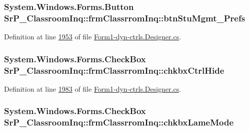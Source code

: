 \hypertarget{class_sr_p___classroom_inq_1_1frm_classrrom_inq_af14017019a644ec6c1d32d49fb0e59f1}{
\subsubsection[{btn\-Stu\-Mgmt\-\_\-\-Prefs}]{\setlength{\rightskip}{0pt plus 5cm}\-System.\-Windows.\-Forms.\-Button {\bf \-Sr\-P\-\_\-\-Classroom\-Inq\-::frm\-Classrrom\-Inq\-::btn\-Stu\-Mgmt\-\_\-\-Prefs}}}
\label{class_sr_p___classroom_inq_1_1frm_classrrom_inq_af14017019a644ec6c1d32d49fb0e59f1}


\-Definition at line \hyperlink{_form1-dyn-ctrls_8_designer_8cs_source_l01953}{1953} of file \hyperlink{_form1-dyn-ctrls_8_designer_8cs_source}{\-Form1-\/dyn-\/ctrls.\-Designer.\-cs}.

\hypertarget{class_sr_p___classroom_inq_1_1frm_classrrom_inq_a65b5726e5b2299abee70eba1a67b6ea3}{
\subsubsection[{chkbx\-Ctrl\-Hide}]{\setlength{\rightskip}{0pt plus 5cm}\-System.\-Windows.\-Forms.\-Check\-Box {\bf \-Sr\-P\-\_\-\-Classroom\-Inq\-::frm\-Classrrom\-Inq\-::chkbx\-Ctrl\-Hide}}}
\label{class_sr_p___classroom_inq_1_1frm_classrrom_inq_a65b5726e5b2299abee70eba1a67b6ea3}


\-Definition at line \hyperlink{_form1-dyn-ctrls_8_designer_8cs_source_l01983}{1983} of file \hyperlink{_form1-dyn-ctrls_8_designer_8cs_source}{\-Form1-\/dyn-\/ctrls.\-Designer.\-cs}.

\hypertarget{class_sr_p___classroom_inq_1_1frm_classrrom_inq_ae2a9d3b663f7c88374a93c3cd9ef6eca}{
\subsubsection[{chkbx\-Lame\-Mode}]{\setlength{\rightskip}{0pt plus 5cm}\-System.\-Windows.\-Forms.\-Check\-Box {\bf \-Sr\-P\-\_\-\-Classroom\-Inq\-::frm\-Classrrom\-Inq\-::chkbx\-Lame\-Mode}}}
\label{class_sr_p___classroom_inq_1_1frm_classrrom_inq_ae2a9d3b663f7c88374a93c3cd9ef6eca}


